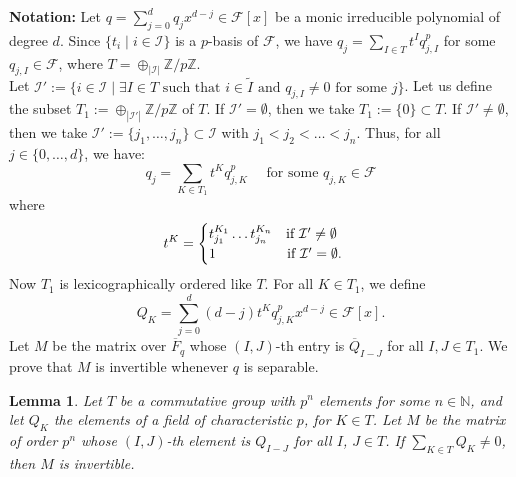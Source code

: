 \documentclass[times,10pt]{amsart}
\newcommand{\N}{\ensuremath{\mathbb{N}}}
\newcommand{\Z}{\ensuremath{\mathbb{Z}}}
\newcommand{\F}{\ensuremath{\mathcal{F}}}
\newcommand{\I}{\ensuremath{\mathcal{I}}}
\newtheorem{lemma}[thm]{Lemma}%
\begin{document}
\textbf{Notation:} Let $q= \sum_{j=0}^{d} q_j x^{d-j}\in \F[x]$ be a monic irreducible polynomial of degree $d$.  Since $ \{ t_i\mid i\in \I\}$ is a $p$-basis of $\F$, we have $q_j= \sum_{I\in T}t^I q_{j,I}^p$ for some $q_{j,I}\in \F$, where $T= \oplus_{|\I|}\Z/p\Z$. \\ Let \label{pagf}$\I':= \{ i\in \I\mid  \exists I\in T \text{ such that } i\in \tilde{I}\text{ and } q_{j,I}\neq0\text{ for some }j\}$.    Let us define the subset $T_1:= \oplus_{|\I'|} \Z/p\Z$ of $T$. If $\I'=\emptyset$, then we take $T_1:=\{0\}\subset T$. If $\I'\neq \emptyset $,  then we take $\I':=\{j_1,\ldots,j_n\}\subset \I$ with $j_1<j_2<\ldots<j_n$.   Thus, for all $j\in \{0,\ldots,d\}$, we have: \begin{equation}\label{ee}q_j= \sum_{K\in T_1}t^K q_{j,K}^p \quad \text{ for some  $q_{j,K}\in \F$}\end{equation}  where $$t^K=\begin{cases}t_{j_1}^{K_1}\ldots t_{j_n}^{K_n}\quad \text{if $\I'\neq \emptyset$}\\ 1\hspace{18mm} \text{if $ \I'=\emptyset$.} \end{cases}$$ Now $T_1$ is {lexicographically ordered}  like $T$.  For all $K\in T_1$,  we define \begin{equation}\label{edq}   {Q_K = \sum_{j=0}^{d} (d-j)t^{K} q^p_{j,K} x^{d-j} \in\F[x]}.\end{equation} Let  \label{dm} $M$ be the matrix  over $\overline{F}_q$  whose $(I,J)$-th entry is {$\overline{Q}_{I-J}$} for all $I,J\in T_1$. We prove that $M$ is invertible whenever $q$ is separable.

\begin{lemma}\label{linv}
    Let $T$ be a commutative  group with $ p^n$ elements  for some $n\in \N$, and let $Q_K$ the elements of a field of characteristic $p$, for $K\in T$. Let $M$ be the matrix of order $p^n$ whose $(I,J)$-th element is $Q_{I-J}$ for all $I$, $J\in T$.  If $\sum_{K\in T} Q_K\neq 0$, then $M$ {is invertible.}  
\end{lemma}
\end{document}

